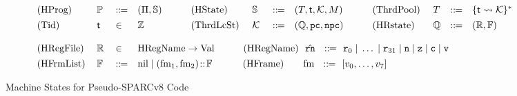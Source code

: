 \begin{figure*}[!t]
    \centering
    \small
    \vspace{-1em}
    \[
        \begin{array}{llllllllllll}
            \TYPE{(HProg)} & \HProg \ & \define &
            (\HMd, \hpstate) &
            \qquad
            \TYPE{(HState)} & \ \hpstate \ & \define &
            (\thrdpool, \thrdid, \hthrdlocalst, \Mem) &
            \qquad
            \TYPE{(ThrdPool)} \ & \thrdpool & \define &
            \{ \thrdid \rightsquigarrow \hthrdlocalst \}^{*}
            \\
            \\[-8pt]
            \TYPE{(Tid)} & \thrdid & \in & \Ztype &
            \qquad
            \TYPE{(ThrdLcSt)} & \ \hthrdlocalst \ & \define &
            (\hRstate, \pc, \npc) &
            \qquad
            \TYPE{(HRstate)} & \hRstate & \define &
            (\hRfile, \hWstk) \\
            \\

            \TYPE{(HRegFile)} \ & \hRfile & \in &
            \multicolumn{9}{l}
            {
                \TYPE{HRegName} \rightarrow \TYPE{Val}
                \qquad\quad
                \TYPE{(HRegName)} \ \ \hrn \ \ \define \ \
                \reg{0} \sepline \dots \sepline \reg{31} \sepline
                \regn \sepline \regz \sepline \regc \sepline \regv
            }
            \\
            \\[-8pt]
            \TYPE{(HFrmList)} & \hWstk & \define &
            \multicolumn{9}{l}
            {
                \nil \sepline (\fm_1, \fm_2) \stCons \hWstk
                \qquad\quad \,
                \TYPE{(HFrame)} \qquad \fm \ \ \define \ \
                [\val_0, \dots, \val_7]
            }
        \end{array}
    \]
    \caption{Machine States for Pseudo-SPARCv8 Code}
    \label{fig:machine-state-concur-pseudo-sparc}
\end{figure*}

